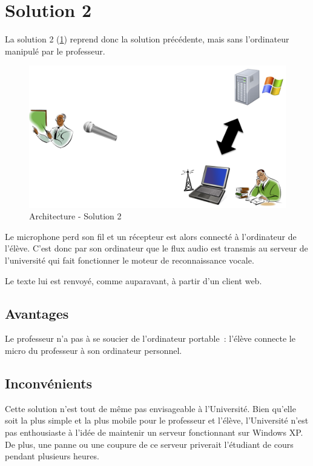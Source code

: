 \section{Solution 2}

La solution 2 (\ref{fig:solution2}) reprend donc la solution précédente, mais sans l'ordinateur manipulé par le professeur.

\begin{figure}[h]
 \centering
 \includegraphics[scale=0.5]{./img/solution2.png}
 \caption{Architecture - Solution 2}
 \label{fig:solution2}
\end{figure}

Le microphone perd son fil et un récepteur est alors connecté à l'ordinateur de l'élève.
C'est donc par son ordinateur que le flux audio est transmis au serveur de l'université qui fait fonctionner le moteur de reconnaissance vocale.

Le texte lui est renvoyé, comme auparavant, à partir d'un client web.

\subsection{Avantages}
Le professeur n'a pas à se soucier de l'ordinateur portable~: l'élève connecte le micro du professeur à son ordinateur personnel.

\subsection{Inconvénients}
Cette solution n'est tout de même pas envisageable à l'Université. Bien qu'elle soit la plus simple et la plus mobile pour le professeur et l'élève, l'Université n'est pas enthousiaste à l'idée de maintenir un serveur fonctionnant sur Windows XP.
De plus, une panne ou une coupure de ce serveur priverait l'étudiant de cours pendant plusieurs heures.

